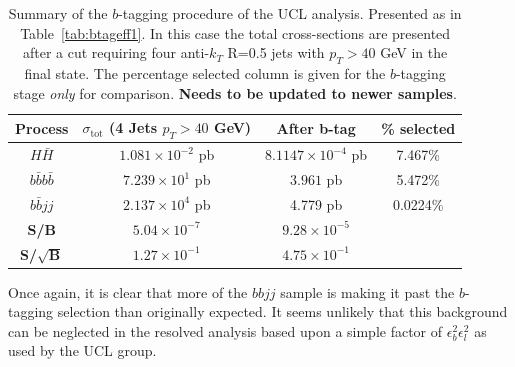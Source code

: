 \documentclass[12pt]{article}
\begin{document}
\begin{table}[h]
\begin{center}
\begin{tabular}{|c|c|c|c|}
\hline
Process & $\sigma_{\mathrm{tot}}$ (4 Jets $p_T>40$ GeV) & After b-tag & \% selected  \\
\hline \hline
$H\bar{H}$ & $1.081 \times 10^{-2}$ pb & $8.1147\times 10^{-4}$ pb & 7.467\% \\
\hline
$b\bar{b}b\bar{b}$ & $7.239 \times10^1$ pb & $3.961$ pb & 5.472\% \\
$b\bar{b}jj$ &  $2.137 \times 10^4$ pb & 4.779 pb & 0.0224\% \\
\hline
\textbf{S/B} & $5.04 \times 10^{-7}$ & $9.28 \times 10^{-5}$& \multicolumn{1}{c}{}\\
\cline{1-3}
\textbf{S/$\sqrt{\mathrm{\textbf{B}}}$}& $1.27 \times 10^{-1}$ & $4.75 \times 10^{-1}$& \multicolumn{1}{c}{}\\
\cline{1-3}
\end{tabular}
\end{center}
\caption{Summary of the $b$-tagging procedure of the UCL analysis. Presented as in Table~\ref{tab:btageff1}. In this case the total cross-sections are presented after a cut requiring four anti-$k_T$ R=0.5 jets with $p_T>40$ GeV in the final state. The percentage selected column is given for the $b$-tagging stage \emph{only} for comparison. \textbf{Needs to be updated to newer samples}.}\label{tab:UCLbtag}
\end{table}%

Once again, it is clear that more of the $bbjj$ sample is making it past the $b$-tagging selection than originally expected. It seems unlikely that this background can be neglected in the resolved analysis based upon a simple factor of $\epsilon_b^{2}\epsilon_l^{2}$ as used by the UCL group.
\end{document}
